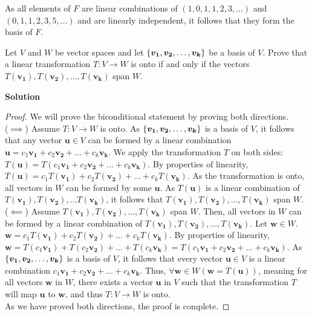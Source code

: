 \documentclass[11pt]{scrartcl}
\theoremstyle{dotlessP}
\theoremstyle{dotlessN}
\DeclarePairedDelimiter\set{\{}{\}}
\begin{document}
As all elements of $F$ are linear combinations of $(1,0,1,1,2,3,\dots)$ and  $(0,1,1,2,3,5,\dots)$ and are linearly independent, it follows that they form the basis of $F$.
\begin{ques}
	Let $V$ and $W$ be vector spaces and let $\set*{\bm{v_1}, \bm{v_2}, \dots, \bm{v_k}}$ be a basis of $V$. Prove that a linear transformation $T: V \to W$ is onto if and only if the vectors $T(\bm{v_1}), T(\bm{v_2}), \dots, T(\bm{v_k})$ span $W$.
\end{ques}
\textbf{Solution}
\begin{proof}
	We will prove the biconditional statement by proving both directions.
	\\

	($\implies$) Assume  $T: V \to W$ is onto. As $\set*{\bm{v_1}, \bm{v_2}, \dots, \bm{v_k}}$ is a basis of $V$, it follows that any vector $\bm{u} \in V$ can be formed by a linear combination $\bm{u} = c_1 \bm{v_1} + c_2 \bm{v_2} + \dots + c_k \bm{v_k}$. We apply the transformation $T$ on both sides: $T(\bm{u}) = T(c_1\bm{v_1} + c_2\bm{v_2}+ \dots + c_k \bm{v_k})$. By properties of linearity, $T(\bm{u}) = c_1T(\bm{v_1}) + c_2T(\bm{v_2}) + \dots + c_kT(\bm{v_k})$. As the transformation is onto, all vectors in  $W$ can be formed by some $\bm{u}$. As $T(\bm{u})$ is a linear combination of $T(\bm{v_1}), T(\bm{v_2}), \dots T(\bm{v_k})$, it follows that $T(\bm{v_1}), T(\bm{v_2}), \dots, T(\bm{v_k})$ span $W$.
	\\

	($\impliedby$) Assume $T(\bm{v_1}), T(\bm{v_2}), \dots, T(\bm{v_k})$ span $W$. Then, all vectors in $W$ can be formed by a linear combination of $T(\bm{v_1}), T(\bm{v_2}), \dots, T(\bm{v_k})$. Let $\bm{w} \in W$. $\bm{w} = c_1 T(\bm{v_1}) + c_2 T(\bm{v_2}) + \dots + c_k T(\bm{v_k})$. By properties of linearity, $\bm{w} = T(c_1 \bm{v_1}) + T(c_2 \bm{v_2}) + \dots + T(c_k \bm{v_k}) = T(c_1 \bm{v_1} + c_2 \bm{v_2} + \dots + c_k \bm{v_k})$. As $\set*{\bm{v_1}, \bm{v_2}, \dots, \bm{v_k}}$ is a basis of $V$, it follows that every vector $\bm{u} \in V$ is a linear combination $c_1 \bm{v_1} + c_2 \bm{v_2} + \dots + c_k \bm{v_k}$. Thus, $\forall \bm{w} \in W(\bm{w} = T(\bm{u}))$, meaning for all vectors $\bm{w}$ in $W$, there exists a vector $\bm{u}$ in $V$ such that the transformation $T$ will map $\bm{u}$ to $\bm{w}$, and thus $T: V \to W$ is onto.
	\\

	As we have proved both directions, the proof is complete.
\end{proof}
\end{document}
